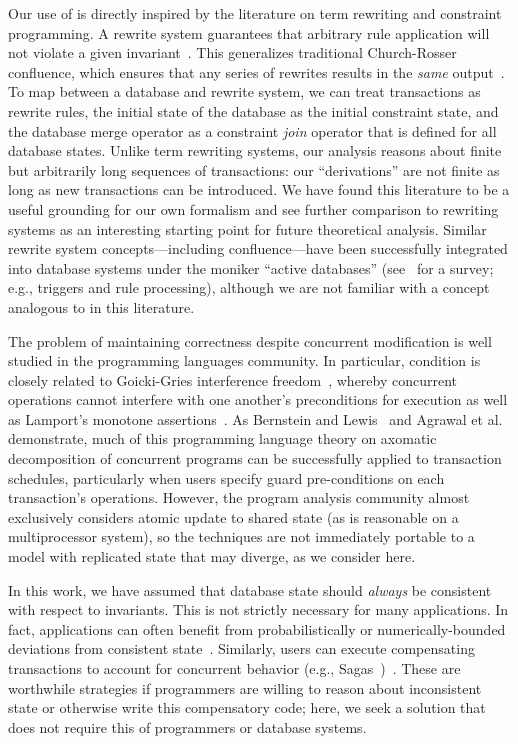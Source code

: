  Our use of \iconfluence is directly inspired
by the literature on term rewriting and constraint programming. A
\iconfluent rewrite system guarantees that arbitrary rule application
will not violate a given invariant~\cite{obs-confluence}. This
generalizes traditional Church-Rosser confluence, which ensures that
any series of rewrites results in the \textit{same}
output~\cite{termrewriting}. To map between a database and rewrite
system, we can treat transactions as rewrite rules, the initial state
of the database as the initial constraint state, and the database
merge operator as a constraint \textit{join} operator that is defined
for all database states. Unlike term rewriting systems, our \cfreedom
analysis reasons about finite but arbitrarily long sequences of
transactions: our ``derivations'' are not finite as long as new
transactions can be introduced. We have found this literature to be a
useful grounding for our own formalism and see further comparison to
rewriting systems as an interesting starting point for future
theoretical analysis. Similar rewrite system concepts---including
confluence---have been successfully integrated into database systems
under the moniker ``active databases'' (see~\cite{activedb-book}
for a survey; e.g., triggers and rule processing), although we are not
familiar with a concept analogous to \iconfluence in this literature.

 The problem of maintaining correctness
despite concurrent modification is well studied in the programming
languages community. In particular, \iconfluence condition is closely
related to Goicki-Gries interference
  freedom~\cite{owickigries}, whereby concurrent operations cannot
interfere with one another's preconditions for execution as well as
Lamport's monotone assertions~\cite{lamport-safety}. As
Bernstein and Lewis~\cite{decomp-semantics} and Agrawal et
al.~\cite{agarwal-consistency} demonstrate, much of this programming
language theory on axomatic decomposition of concurrent programs can
be successfully applied to transaction schedules, particularly when
users specify guard pre-conditions on each transaction's
operations. However, the program analysis community almost exclusively
considers atomic update to shared state (as is reasonable on a
multiprocessor system), so the techniques are not immediately portable
to a model with replicated state that may diverge, as we consider
here.

 In this work, we have assumed that
database state should \textit{always} be consistent with respect to
invariants. This is not strictly necessary for many applications. In
fact, applications can often benefit from probabilistically or
numerically-bounded deviations from consistent
state~\cite{epsilon-divergence}. Similarly, users can execute
compensating transactions to account for concurrent behavior (e.g.,
Sagas~\cite{sagas})~\cite{ic-survey,ic-survey-two}. These are worthwhile
strategies if programmers are willing to reason about inconsistent
state or otherwise write this compensatory code; here,
we seek a solution that does not require this of programmers or
database systems.

